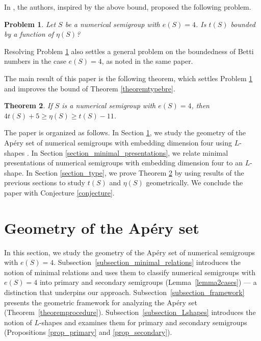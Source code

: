 \documentclass[12pt]{article}
\newtheorem{thm}{Theorem}[section]
\newtheorem{prob}[thm]{Problem}
\theoremstyle{remark}
\begin{document}
In \cite{MoscarielloSammartano2025}, the authors, inspired by the above bound, proposed the following problem.

\begin{prob}\label{problemtype}
    \textup{\cite[Problem 25]{MoscarielloSammartano2025}} Let $S$ be a numerical semigroup with $e(S) = 4$. Is $t(S)$ bounded by a function of $\eta(S)$?
\end{prob}

Resolving Problem \ref{problemtype} also settles a general
problem on the boundedness of Betti numbers \cite[Problem 24]{MoscarielloSammartano2025} in the case $e(S)=4$, as noted in the same paper.

The main result of this paper is the following theorem, which settles Problem \ref{problemtype} and improves the bound of Theorem \ref{theoremtypebre}.

\begin{thm}\label{theorem_type_main}
    If $S$ is a numerical semigroup with $e(S) = 4$, then $4 t(S) +5 \geq \eta(S) \geq t(S) - 11$. 
\end{thm}

 

The paper is organized as follows.
In Section \ref{section_geometricprocedure}, we study the geometry of the Ap{\'e}ry set of numerical semigroups with embedding dimension four using $L$-shapes \cite{AGUILOGOST2015}. 
In Section \ref{section_minimal_presentations}, we relate minimal presentations of numerical semigroups with embedding dimension four to an $L$-shape.
In Section \ref{section_type}, we prove Theorem \ref{theorem_type_main} by using results of the previous sections to study $t(S)$ and $\eta(S)$ geometrically.
We conclude the paper with Conjecture \ref{conjecture}.






\section{Geometry of the Ap{\'e}ry set}\label{section_geometricprocedure}



In this section, we study the geometry of the Ap{\'e}ry set of numerical semigroups with $e(S)=4$. Subsection~\ref{subsection_minimal_relations} introduces the notion of minimal relations and uses them to classify numerical semigroups with $e(S)=4$ into primary and secondary semigroups (Lemma~\ref{lemma2cases}) --- a distinction that underpins our approach. Subsection~\ref{subsection_framework} presents the geometric framework for analyzing the Apéry set (Theorem~\ref{theoremprocedure}). Subsection~\ref{subsection_Lshapes} introduces the notion of $L$-shapes and examines them for primary and secondary semigroups (Propositions \ref{prop_primary} and \ref{prop_secondary}).
\end{document}
